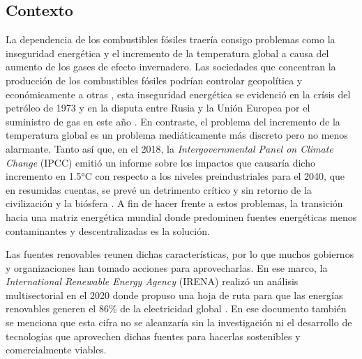 
\subsection{Contexto}

La dependencia de los combustibles fósiles traería consigo problemas como la inseguridad energética y el incremento de la temperatura global a causa del aumento de los gases de efecto invernadero. Las sociedades que concentran la producción de los combustibles fósiles podrían controlar geopolítica y económicamente a otras \cite{mayer2022fossil}, esta inseguridad energética se evidenció en la crísis del petróleo de 1973 \cite{vernon1976oil} y en la disputa entre Rusia y la Unión Europea por el suministro de gas en este año \cite{rodriguez2022improving}. En contraste, el problema del incremento de la temperatura global es un problema mediáticamente más discreto pero no menos alarmante. Tanto así que, en el 2018, la \textit{Intergovernmental Panel on Climate Change} (IPCC) emitió un informe sobre los impactos que causaría dicho incremento en 1.5°C con respecto a los niveles preindustriales para el 2040, que en resumidas cuentas, se prevé un detrimento crítico y sin retorno de la civilización y la biósfera \cite{guilyardi2018ipcc}. A fin de hacer frente a estos problemas, la transición hacia una matriz energética mundial donde predominen fuentes energéticas menos contaminantes y descentralizadas es la solución. 



Las fuentes renovables reunen dichas características, por lo que muchos gobiernos y organizaciones han tomado acciones para aprovecharlas. En ese marco, la \textit{International Renewable Energy Agency} (IRENA) realizó un análisis multisectorial en el 2020 donde propuso una hoja de ruta para que las energías renovables generen el 86\% de la electricidad global \cite{asmelash2020role}. En ese documento también se menciona que esta cifra no se alcanzaría sin la investigación ni el desarrollo de tecnologías que aprovechen dichas fuentes para hacerlas sostenibles y comercialmente viables.

